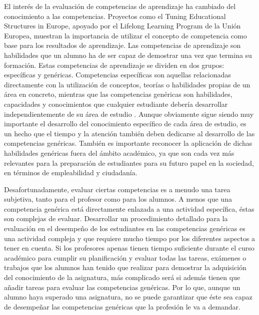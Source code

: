 


El interés de la evaluación de competencias de aprendizaje ha cambiado del conocimiento a las competencias. Proyectos como el Tuning Educational Structures in Europe, apoyado por el Lifelong Learning Program de la Unión Europea, muestran la importancia de utilizar el concepto de competencia como base para los resultados de aprendizaje. Las competencias de aprendizaje son habilidades que un alumno ha de ser capaz de demostrar una vez que termina su formación. Estas competencias de aprendizaje se dividen en dos grupos: específicas y genéricas. Competencias específicas son aquellas relacionadas directamente con la utilización de conceptos, teorías o habilidades propias de un área en concreto, mientras que las competencias genéricas son habilidades, capacidades y conocimientos que cualquier estudiante debería desarrollar independientemente de su área de estudio \cite{Tuning:2003}. Aunque obviamente sigue siendo muy importante el desarrollo del conocimiento específico de cada área de estudio, es un hecho que el tiempo y la atención también deben dedicarse al desarrollo de las competencias genéricas. También es importante reconocer la aplicación de dichas habilidades genéricas fuera del ámbito académico, ya que son cada vez más relevantes para la preparación de estudiantes para su futuro papel en la sociedad, en términos de empleabilidad y ciudadanía.

Desafortunadamente, evaluar ciertas competencias es a menudo una tarea subjetiva, tanto para el profesor como para los alumnos. A menos que una competencia genérica está directamente enlazada a una actividad específica, éstas son complejas de evaluar. Desarrollar un procedimiento detallado para la evaluación en el desempeño de los estudiantes en las competencias genéricas es una actividad compleja y que requiere mucho tiempo por los diferentes aspectos a tener en cuenta. Si los profesores apenas tienen tiempo suficiente durante el curso académico para cumplir su planificación y evaluar todas las tareas, exámenes o trabajos que los alumnos han tenido que realizar para demostrar la adquisición del conocimiento de la asignatura, más complicado será si además tienen que añadir tareas para evaluar las competencias genéricas. Por lo que, aunque un alumno haya superado una asignatura, no se puede garantizar que éste sea capaz de desempeñar las competencias genéricas que la profesión le va a demandar.

